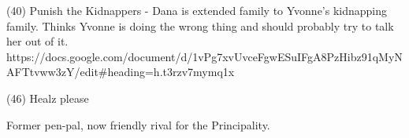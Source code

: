 \documentclass[char]{GL2020}
\begin{document}
(40) Punish the Kidnappers - Dana is extended family to Yvonne's kidnapping family. Thinks Yvonne is doing the wrong thing and should probably try to talk her out of it.
https://docs.google.com/document/d/1vPg7xvUvceFgwESuIFgA8PzHibz91qMyNAFTtvww3zY/edit#heading=h.t3rzv7mymq1x

(46) Healz please

\begin{itemz}[Goals]
	\item 
\end{itemz}

\begin{itemz}[Notes]
	\item 
\end{itemz}

\begin{contacts}
	\contact{\cBeetle{}} Former pen-pal, now friendly rival for the Principality.
	\contact{\cYvonne{}} 
\end{contacts}
\end{document}
